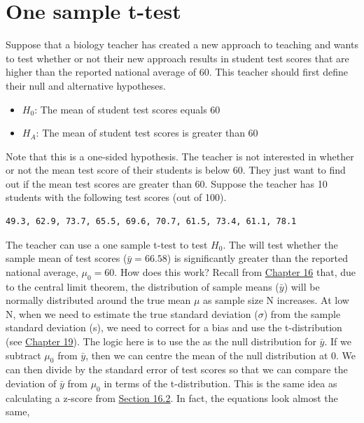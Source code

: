 \documentclass[
  openany]{krantz}
\providecommand{\tightlist}{%
  \setlength{\itemsep}{0pt}\setlength{\parskip}{0pt}}
\begin{document}
\hypertarget{one-sample-t-test}{%
\section{One sample t-test}\label{one-sample-t-test}}

Suppose that a biology teacher has created a new approach to teaching and wants to test whether or not their new approach results in student test scores that are higher than the reported national average of 60.
This teacher should first define their null and alternative hypotheses.

\begin{itemize}
\tightlist
\item
  \(H_{0}\): The mean of student test scores equals 60
\item
  \(H_{A}\): The mean of student test scores is greater than 60
\end{itemize}

Note that this is a one-sided hypothesis.
The teacher is not interested in whether or not the mean test score of their students is below 60.
They just want to find out if the mean test scores are greater than 60.
Suppose the teacher has 10 students with the following test scores (out of 100).

\begin{verbatim}
49.3, 62.9, 73.7, 65.5, 69.6, 70.7, 61.5, 73.4, 61.1, 78.1
\end{verbatim}

The teacher can use a one sample t-test to test \(H_{0}\).
The  will test whether the sample mean of test scores (\(\bar{y} = 66.58\)) is significantly greater than the reported national average, \(\mu_{0} = 60\).
How does this work?
Recall from \protect\hyperlink{Chapter_16}{Chapter 16} that, due to the central limit theorem, the distribution of sample means (\(\bar{y}\)) will be normally distributed around the true mean \(\mu\) as sample size N increases.
At low N, when we need to estimate the true standard deviation (\(\sigma\)) from the sample standard deviation (s), we need to correct for a bias and use the t-distribution (see \protect\hyperlink{Chapter_19}{Chapter 19}).
The logic here is to use the  as the null distribution for \(\bar{y}\).
If we subtract \(\mu_{0}\) from \(\bar{y}\), then we can centre the mean of the null distribution at 0.
We can then divide by the standard error of test scores so that we can compare the deviation of \(\bar{y}\) from \(\mu_{0}\) in terms of the t-distribution.
This is the same idea as calculating a z-score from \protect\hyperlink{probability-and-z-scores}{Section 16.2}.
In fact, the equations look almost the same,
\end{document}
